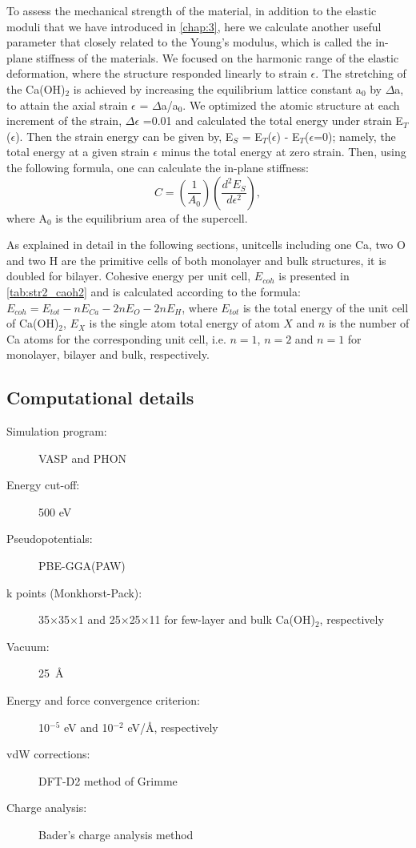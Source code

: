 To assess the mechanical strength of the material, in addition to the elastic moduli that we have introduced in \autoref{chap:3}, here we calculate another useful parameter that closely related to the Young's modulus, which is called the in-plane stiffness of the materials. We 
focused on the harmonic range of the elastic deformation, where the structure 
responded linearly to strain $\epsilon$. The stretching of the Ca(OH)$_{2}$ is 
achieved by increasing the equilibrium lattice constant a$_{0}$ by $\Delta$a, 
to attain the axial strain $\epsilon$ = $\Delta$a/a$_{0}$. We optimized the 
atomic structure at each increment of the strain, $\Delta\epsilon$ =0.01 and 
calculated the total energy under strain E$_{T}$($\epsilon$). Then the strain 
energy can be given by, E$_{S}$ = E$_{T}$($\epsilon$) - E$_{T}$($\epsilon$=0); 
namely, the total energy at a given strain $\epsilon$ minus the total energy at 
zero strain. Then, using the following formula, one can calculate the in-plane 
stiffness: 
\begin{equation}
 C = (\dfrac{1}{A_{0}})(\dfrac{d^{2}E_{S}}{d\epsilon^{2}}),
\end{equation}
where A$_{0}$ is the equilibrium area of the supercell.

As explained in detail in the following sections, unitcells including one Ca,
two O and two H are the primitive cells of both monolayer and bulk structures, 
it is doubled for bilayer. Cohesive energy per unit cell,
$E_{coh}$ is presented in \autoref{tab:str2_caoh2} and is calculated according to the formula:
$E_{coh}=E_{tot}-nE_{Ca}-2nE_O-2nE_H$, where $E_{tot}$ is the total energy
of the unit cell of Ca(OH)$_2$, $E_X$ is the single atom total energy of atom $X$
and $n$ is the number of Ca atoms for the corresponding unit cell, i.e.
$n=1$, $n=2$ and $n=1$ for monolayer, bilayer and bulk, respectively. 

\subsection{Computational details}

\begin{footnotesize}
\begin{description}
\item[Simulation program:] VASP and PHON\cite{alfe}
\item[Energy cut-off:] 500 eV
\item[Pseudopotentials:] PBE-GGA(PAW)
\item[k points (Monkhorst-Pack):] 35$\times$35$\times$1 and 25$\times$25$\times$11 for few-layer and bulk Ca(OH)$_{2}$, respectively 
\item[Vacuum:] 25~\AA
\item[Energy and force convergence criterion:] 10$^{-5}$ eV and 10$^{-2}$ eV/\AA, respectively
\item[vdW corrections:] DFT-D2 method of Grimme \cite{Grimme}
\item[Charge analysis:] Bader's charge analysis method\cite{Bader1,Bader2,Bader3}
\end{description}
\end{footnotesize}



